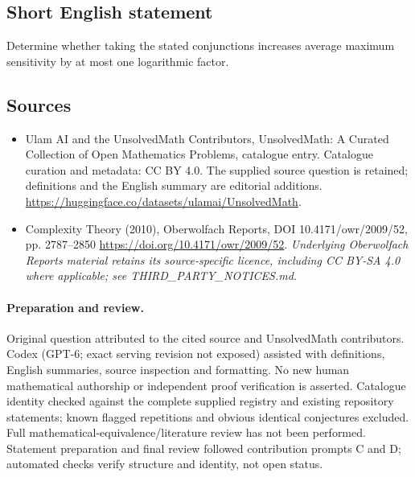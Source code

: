 \documentclass[11pt]{article}
\begin{document}
\subsection{Short English statement}
Determine whether taking the stated conjunctions increases average maximum sensitivity by at most one logarithmic factor.
\subsection{Sources}
\begin{itemize}
\item[\hypertarget{source:statement:1}{S1}] Ulam AI and the UnsolvedMath Contributors, UnsolvedMath: A Curated Collection of Open Mathematics Problems, catalogue entry. Catalogue curation and metadata: CC BY 4.0. The supplied source question is retained; definitions and the English summary are editorial additions.
\url{https://huggingface.co/datasets/ulamai/UnsolvedMath}.
\item[\hypertarget{source:statement:2}{S2}] Complexity Theory (2010), Oberwolfach Reports, DOI 10.4171/owr/2009/52, pp. 2787--2850
\url{https://doi.org/10.4171/owr/2009/52}.
\textit{Underlying Oberwolfach Reports material retains its source-specific licence, including CC BY-SA 4.0 where applicable; see THIRD\_PARTY\_NOTICES.md.}
\end{itemize}
\paragraph{Preparation and review.}
Original question attributed to the cited source and UnsolvedMath contributors. Codex (GPT-6; exact serving revision not exposed) assisted with definitions, English summaries, source inspection and formatting. No new human mathematical authorship or independent proof verification is asserted. Catalogue identity checked against the complete supplied registry and existing repository statements; known flagged repetitions and obvious identical conjectures excluded. Full mathematical-equivalence/literature review has not been performed. Statement preparation and final review followed contribution prompts C and D; automated checks verify structure and identity, not open status.
\label{end:statement}
\end{document}
